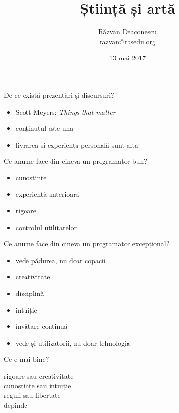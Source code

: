\documentclass{simple}
\title[Știință și artă]{Știință și artă}
\institute{CDL, ROSEdu}
\author[Răzvan Deaconescu]{Răzvan Deaconescu \\
razvan@rosedu.org}
\date{13 mai 2017}
\begin{document}
\frame{\titlepage}

\begin{frame}{De ce există prezentări și discursuri?}
  \begin{itemize}
    \pause
    \item Scott Meyers: \textit{Things that matter}
    \pause
    \item conținutul este una
    \pause
    \item livrarea și experiența personală sunt alta
  \end{itemize}
\end{frame}

\begin{frame}{Ce anume face din cineva un programator bun?}
  \begin{itemize}
    \pause
    \item cunoștințe
    \item experiență anterioară
    \item rigoare
    \item controlul utilitarelor
  \end{itemize}
\end{frame}

\begin{frame}{Ce anume face din cineva un programator excepțional?}
  \begin{itemize}
    \pause
    \item vede pădurea, nu doar copacii
    \item creativitate
    \item disciplină
    \item intuiție
    \item învățare continuă
    \item vede și utilizatorii, nu doar tehnologia
  \end{itemize}
\end{frame}

\begin{frame}{Ce e mai bine?}
  \begin{center}
    \pause
    rigoare sau creativitate \\
    \vspace{0.5cm}
    \pause
    cunoștințe sau intuiție \\
    \vspace{0.5cm}
    \pause
    reguli sau libertate\\
    \vspace{1cm}
    \pause
    \Large{depinde}
  \end{center}
\end{frame}
\end{document}
